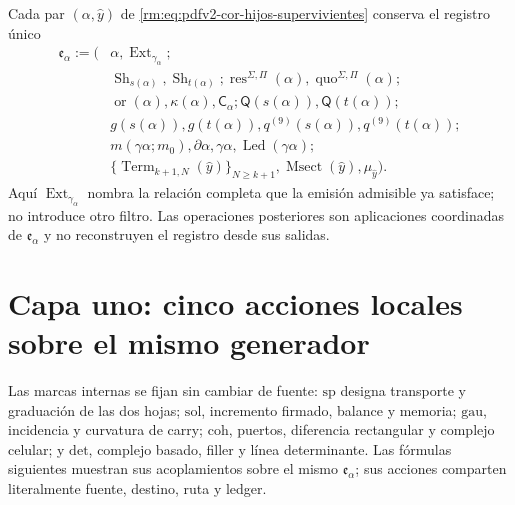 Cada par \((\alpha,\widehat y)\) de
\eqref{rm:eq:pdfv2-cor-hijos-supervivientes} conserva el registro único
\begin{equation}
\label{rm:eq:pdfv2-cor-registro-extension}
 \begin{aligned}
 \mathfrak e_\alpha:=\bigl(&
 \alpha,\operatorname{Ext}_{\gamma_\alpha};\\
 &\operatorname{Sh}_{s(\alpha)},\operatorname{Sh}_{t(\alpha)};
 \operatorname{res}^{\Sigma,\Pi}(\alpha),
 \operatorname{quo}^{\Sigma,\Pi}(\alpha);\\
 &\operatorname{or}(\alpha),\kappa(\alpha),\mathsf C_\alpha;
 \mathsf Q(s(\alpha)),\mathsf Q(t(\alpha));\\
 &g(s(\alpha)),g(t(\alpha)),
 q^{(9)}(s(\alpha)),q^{(9)}(t(\alpha));\\
 &
 m(\gamma\alpha;m_0),\partial\alpha,\gamma\alpha,
 \operatorname{Led}(\gamma\alpha);\\
 &\{\operatorname{Term}_{k+1,N}(\widehat y)\}_{N\geq k+1},
 \operatorname{Msect}(\widehat y),\mu_{\widehat y}\bigr).
 \end{aligned}
\end{equation}
Aquí \(\operatorname{Ext}_{\gamma_\alpha}\) nombra la relación completa que
la emisión admisible ya satisface; no introduce otro filtro. Las operaciones
posteriores son aplicaciones coordinadas de \(\mathfrak e_\alpha\) y no
reconstruyen el registro desde sus salidas.

\section{Capa uno: cinco acciones locales sobre el mismo generador}

Las marcas internas se fijan sin cambiar de fuente:
\(\mathrm{sp}\) designa transporte y graduación de las dos hojas;
\(\mathrm{sol}\), incremento firmado, balance y memoria;
\(\mathrm{gau}\), incidencia y curvatura de carry;
\(\mathrm{coh}\), puertos, diferencia rectangular y complejo celular; y
\(\mathrm{det}\), complejo basado, filler y línea determinante. Las fórmulas
siguientes muestran sus acoplamientos sobre el mismo
\(\mathfrak e_\alpha\); sus acciones comparten literalmente fuente, destino,
ruta y ledger.

